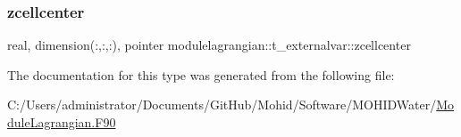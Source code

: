 \mbox{\label{structmodulelagrangian_1_1t__externalvar_acbee2d5d05aa2dcb10edcd2d58090c8a}} 
\subsubsection{\texorpdfstring{zcellcenter}{zcellcenter}}
{\footnotesize\ttfamily real, dimension(\+:,\+:,\+:), pointer modulelagrangian\+::t\+\_\+externalvar\+::zcellcenter\hspace{0.3cm}{\ttfamily [private]}}



The documentation for this type was generated from the following file\+:\begin{DoxyCompactItemize}
\item 
C\+:/\+Users/administrator/\+Documents/\+Git\+Hub/\+Mohid/\+Software/\+M\+O\+H\+I\+D\+Water/\mbox{\hyperlink{_module_lagrangian_8_f90}{Module\+Lagrangian.\+F90}}\end{DoxyCompactItemize}
